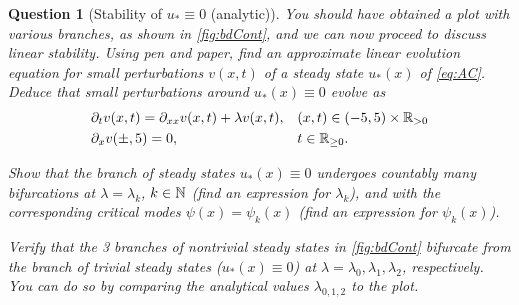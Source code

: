 \documentclass[a4paper]{siamart220329}
\theoremstyle{plain}
\newtheorem{question}{Question}
\begin{document}
\begin{question}[Stability of $u_* \equiv 0$ (analytic)]\label{question:stabAna}
  You should have obtained a plot with
  various branches, as shown in \cref{fig:bdCont}, and we can now proceed to discuss
  linear stability. Using pen and paper, find an approximate linear evolution equation for small
  perturbations $v(x,t)$ of a steady state $u_*(x)$ of \cref{eq:AC}. Deduce that
  small perturbations around $u_*(x) \equiv 0$ evolve as
  \begin{equation}\label{eq:linear}
    \begin{aligned}
      & \partial_t v(x,t) = \partial_{xx}v(x,t) + \lambda v(x,t), && (x,t) \in (-5,5) \times \RSet_{> 0} \\
      & \partial_x v(\pm ,5) = 0,         && t \in \RSet_{\geq 0}.
    \end{aligned}
  \end{equation}
 
  Show that the branch of steady states $u_*(x) \equiv 0$ undergoes countably many
  bifurcations at $\lambda = \lambda_k$, $k \in \mathbb{N}$ (find an expression for
  $\lambda_k$), and with the corresponding critical modes  $\psi(x) = \psi_k(x)$
  (find an expression for $\psi_k(x)$).

  Verify that the 3 branches of nontrivial steady states in \cref{fig:bdCont}
  bifurcate from the branch of trivial steady states ($u_*(x) \equiv 0$) at $\lambda
  = \lambda_0, \lambda_1,\lambda_2$, respectively. You can do so by comparing the
  analytical values $\lambda_{0,1,2}$ to the plot.
\end{question}
\end{document}
